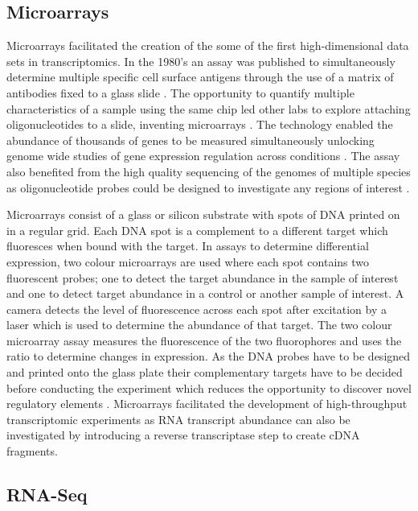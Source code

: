 \documentclass[../main.tex]{subfiles}
\begin{document}
\subsection{Microarrays}

Microarrays facilitated the creation of the some of the first high-dimensional data sets in transcriptomics.
In the 1980's an assay was published to simultaneously determine multiple specific cell surface antigens through the use of a matrix of antibodies fixed to a glass slide \parencite{TseWen1983}.
The opportunity to quantify multiple characteristics of a sample using the same chip led other labs to explore attaching oligonucleotides to a slide, inventing microarrays \parencite{Schena1995}.
The technology enabled the abundance of thousands of genes to be measured simultaneously unlocking genome wide studies of gene expression regulation across conditions \parencite{Gasch2000}. 
The assay also benefited from the high quality sequencing of the genomes of multiple species as oligonucleotide probes could be designed to investigate any regions of interest \parencite{Lander2001}.

Microarrays consist of a glass or silicon substrate with spots of DNA printed on in a regular grid. 
Each DNA spot is a complement to a different target which fluoresces when bound with the target. 
In assays to determine differential expression, two colour microarrays are used where each spot contains two fluorescent probes; one to detect the target abundance in the sample of interest and one to detect target abundance in a control or another sample of interest.
A camera detects the level of fluorescence across each spot after excitation by a laser which is used to determine the abundance of that target.  
The two colour microarray assay measures the fluorescence of the two fluorophores and uses the ratio to determine changes in expression.
As the DNA probes have to be designed and printed onto the glass plate their complementary targets have to be decided before conducting the experiment which reduces the opportunity to discover novel regulatory elements \parencite{Schena1995}.
Microarrays facilitated the development of high-throughput transcriptomic experiments as RNA transcript abundance can also be investigated by introducing a reverse transcriptase step to create cDNA fragments. 

\subsection{RNA-Seq}
\end{document}
